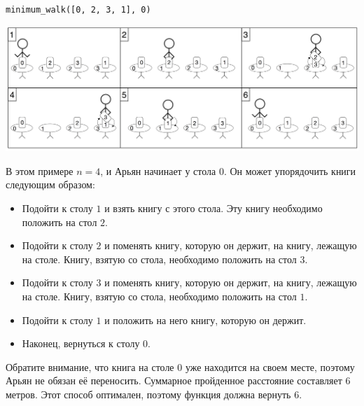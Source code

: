 \texttt{minimum\_walk([0, 2, 3, 1], 0)}

\includegraphics[scale=0.5]{books.png}

В этом примере $n = 4$, и Арьян начинает у стола $0$. Он может упорядочить книги следующим
образом:
\begin{itemize}
\item Подойти к столу $1$ и взять книгу с этого стола. Эту книгу необходимо положить на стол $2$.
\item Подойти к столу $2$ и поменять книгу, которую он держит, на книгу, лежащую на столе.
Книгу, взятую со стола, необходимо положить на стол $3$.
\item Подойти к столу $3$ и поменять книгу, которую он держит, на книгу, лежащую на столе.
Книгу, взятую со стола, необходимо положить на стол $1$.
\item Подойти к столу $1$ и положить на него книгу, которую он держит.
\item Наконец, вернуться к столу $0$.
\end{itemize}

Обратите внимание, что книга на столе $0$ уже находится на своем месте, поэтому Арьян не
обязан её переносить. Суммарное пройденное расстояние составляет $6$ метров. Этот способ
оптимален, поэтому функция должна вернуть $6$.